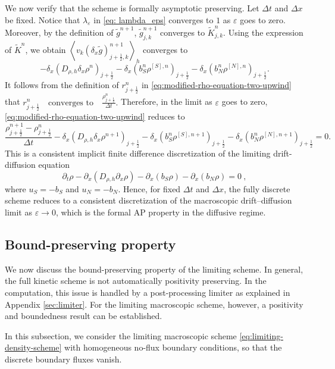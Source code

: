\documentclass[11pt,twoside]{article}
\numberwithin{equation}{section}
\theoremstyle{plain}
\theoremstyle{nonumberplain}
\begin{document}
{{We now verify that the scheme is formally asymptotic preserving. 
Let \(\Delta t\) and \(\Delta x\) be fixed. Notice that $\lambda_\varepsilon$ in \eqref{eq: lambda_eps}
 converges to \(1\) as \(\varepsilon\) goes to zero.
Moreover, by the definition of \(\widetilde g^{n+1}\),
\(\widetilde g_{j,k}^{n+1}\) converges to \(\widetilde K_{j,k}^{n}\).
Using the expression of \(\widetilde K^n\), we obtain \(\left\langle
v_k(\delta_x\widetilde g)_{j+\frac12,k}^{n+1}
\right\rangle_h\) converges to
\[
-\delta_x\left(D_{\rho,h}\delta_x\rho^n\right)_{j+\frac12}
-
\delta_x\left(b_S^n\rho^{[S],n}\right)_{j+\frac12}
-
\delta_x\left(b_N^n\rho^{[N],n}\right)_{j+\frac12}.
\]
It follows from the definition of \(r_{j+\frac12}^n\) in
\eqref{eq:modified-rho-equation-two-upwind} that
\(
r_{j+\frac12}^n
\quad\text{converges to}\quad
\frac{\rho_{j+\frac12}^n}{\Delta t}.
\)
Therefore, in the limit as \(\varepsilon\) goes to zero,
\eqref{eq:modified-rho-equation-two-upwind} reduces to
\begin{equation}\label{eq:limiting-density-scheme}
\frac{\rho_{j+\frac12}^{n+1}-\rho_{j+\frac12}^{n}}{\Delta t}
-
\delta_x\left(
D_{\rho,h}\delta_x\rho^{n+1}
\right)_{j+\frac12}
-
\delta_x\left(
b_S^n\rho^{[S],n+1}
\right)_{j+\frac12}
-
\delta_x\left(
b_N^n\rho^{[N],n+1}
\right)_{j+\frac12}
=0 .
\end{equation}
This is a consistent implicit finite difference discretization of the
limiting drift-diffusion equation
\[
\partial_t\rho
-
\partial_x\left(D_{\rho,h}\partial_x\rho\right)
-
\partial_x\left(b_S\rho\right)
-
\partial_x\left(b_N\rho\right)
=0\ ,
\]
where \(u_S=-b_S\) and \(u_N=-b_N\).
Hence, for fixed $\Delta t$ and $\Delta x$, the fully discrete scheme reduces to a consistent discretization of the macroscopic drift–diffusion limit as $\varepsilon\to0$, which is the formal AP property in the diffusive regime.

\subsection{Bound-preserving property}

We now discuss the bound-preserving property of the limiting scheme.
In general, the full kinetic scheme is not automatically positivity
preserving. In the computation, this issue is handled by a post-processing
limiter as explained in Appendix \ref{sec:limiter}. For the limiting macroscopic scheme, however, a positivity and
boundedness result can be established.

In this subsection, we consider the limiting macroscopic scheme \eqref{eq:limiting-density-scheme} with
homogeneous no-flux boundary conditions, so that the discrete boundary
fluxes vanish. 

}}
\end{document}

